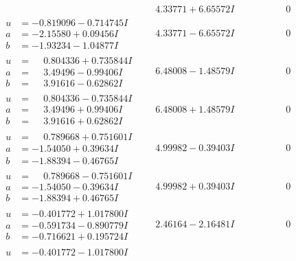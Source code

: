 \documentclass[1p]{elsarticle_modified}
\theoremstyle{definition}
\begin{document}
$$\begin{array}{c|c|c}
 & \phantom{-}4.33771 + 6.65572 I & \phantom{-0.000000 } 0 \\ \hline\begin{aligned}
u &= -0.819096 - 0.714745 I \\
a &= -2.15580 + 0.09456 I \\
b &= -1.93234 - 1.04877 I\end{aligned}
 & \phantom{-}4.33771 - 6.65572 I & \phantom{-0.000000 } 0 \\ \hline\begin{aligned}
u &= \phantom{-}0.804336 + 0.735844 I \\
a &= \phantom{-}3.49496 - 0.99406 I \\
b &= \phantom{-}3.91616 - 0.62862 I\end{aligned}
 & \phantom{-}6.48008 - 1.48579 I & \phantom{-0.000000 } 0 \\ \hline\begin{aligned}
u &= \phantom{-}0.804336 - 0.735844 I \\
a &= \phantom{-}3.49496 + 0.99406 I \\
b &= \phantom{-}3.91616 + 0.62862 I\end{aligned}
 & \phantom{-}6.48008 + 1.48579 I & \phantom{-0.000000 } 0 \\ \hline\begin{aligned}
u &= \phantom{-}0.789668 + 0.751601 I \\
a &= -1.54050 + 0.39634 I \\
b &= -1.88394 - 0.46765 I\end{aligned}
 & \phantom{-}4.99982 - 0.39403 I & \phantom{-0.000000 } 0 \\ \hline\begin{aligned}
u &= \phantom{-}0.789668 - 0.751601 I \\
a &= -1.54050 - 0.39634 I \\
b &= -1.88394 + 0.46765 I\end{aligned}
 & \phantom{-}4.99982 + 0.39403 I & \phantom{-0.000000 } 0 \\ \hline\begin{aligned}
u &= -0.401772 + 1.017800 I \\
a &= -0.591734 - 0.890779 I \\
b &= -0.716621 + 0.195724 I\end{aligned}
 & \phantom{-}2.46164 - 2.16481 I & \phantom{-0.000000 } 0 \\ \hline\begin{aligned}
u &= -0.401772 - 1.017800 I \\

\end{aligned}
\end{array}$$
\end{document}

